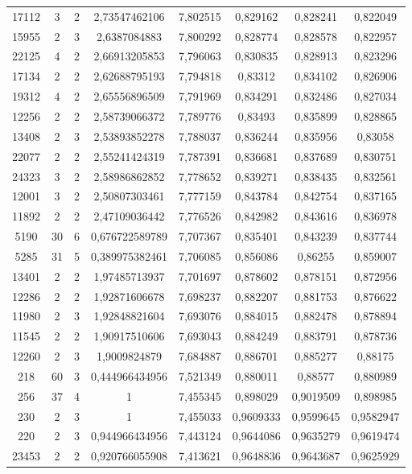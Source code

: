 \begin{longtable}{|c|c|c|c|c|c|c|c|}
17112 & 3 & 2 & 2,73547462106 & 7,802515 & 0,829162 & 0,828241 & 0,822049 \\
15955 & 2 & 3 & 2,6387084883 & 7,800292 & 0,828774 & 0,828578 & 0,822957 \\
22125 & 4 & 2 & 2,66913205853 & 7,796063 & 0,830835 & 0,828913 & 0,823296 \\
17134 & 2 & 2 & 2,62688795193 & 7,794818 & 0,83312 & 0,834102 & 0,826906 \\
19312 & 4 & 2 & 2,65556896509 & 7,791969 & 0,834291 & 0,832486 & 0,827034 \\
12256 & 2 & 2 & 2,58739066372 & 7,789776 & 0,83493 & 0,835899 & 0,828865 \\
13408 & 2 & 3 & 2,53893852278 & 7,788037 & 0,836244 & 0,835956 & 0,83058 \\
22077 & 2 & 2 & 2,55241424319 & 7,787391 & 0,836681 & 0,837689 & 0,830751 \\
24323 & 3 & 2 & 2,58986862852 & 7,778652 & 0,839271 & 0,838435 & 0,832561 \\
12001 & 3 & 2 & 2,50807303461 & 7,777159 & 0,843784 & 0,842754 & 0,837165 \\
11892 & 2 & 2 & 2,47109036442 & 7,776526 & 0,842982 & 0,843616 & 0,836978 \\
5190 & 30 & 6 & 0,676722589789 & 7,707367 & 0,835401 & 0,843239 & 0,837744 \\
5285 & 31 & 5 & 0,389975382461 & 7,706085 & 0,856086 & 0,86255 & 0,859007 \\
13401 & 2 & 2 & 1,97485713937 & 7,701697 & 0,878602 & 0,878151 & 0,872956 \\
12286 & 2 & 2 & 1,92871606678 & 7,698237 & 0,882207 & 0,881753 & 0,876622 \\
11980 & 2 & 3 & 1,92848821604 & 7,693076 & 0,884015 & 0,882478 & 0,878894 \\
11545 & 2 & 2 & 1,90917510606 & 7,693043 & 0,884249 & 0,883791 & 0,878736 \\
12260 & 2 & 3 & 1,9009824879 & 7,684887 & 0,886701 & 0,885277 & 0,88175 \\
218 & 60 & 3 & 0,444966434956 & 7,521349 & 0,880011 & 0,88577 & 0,880989 \\
256 & 37 & 4 & 1 & 7,455345 & 0,898029 & 0,9019509 & 0,898985 \\
230 & 2 & 3 & 1 & 7,455033 & 0,9609333 & 0,9599645 & 0,9582947 \\
220 & 2 & 3 & 0,944966434956 & 7,443124 & 0,9644086 & 0,9635279 & 0,9619474 \\
23453 & 2 & 2 & 0,920766055908 & 7,413621 & 0,9648836 & 0,9643687 & 0,9625929 \\

\end{longtable}
